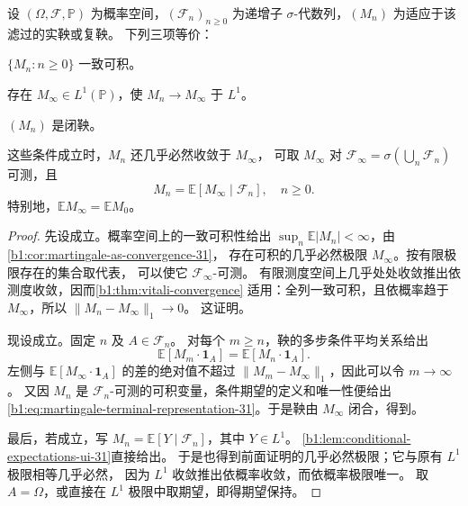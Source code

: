 \begin{theorem}[一致可积鞅与终值表示]
\label{b1:thm:closed-martingale-31}
设 \((\Omega,\mathcal F,\mathbb P)\) 为概率空间，\((\mathcal F_n)_{n\geq0}\)
为递增子 \(\sigma\)-代数列，\((M_n)\) 为适应于该滤过的实鞅或复鞅。
下列三项等价：
\begin{equivalences}
 \item\label{b1:item:closed-ui-31}\(\{M_n:n\geq0\}\) 一致可积。
 \item\label{b1:item:closed-l1-31}存在 \(M_\infty\in L^1(\mathbb P)\)，使 \(M_n\to M_\infty\) 于 \(L^1\)。
 \item\label{b1:item:closed-representation-31}\((M_n)\) 是闭鞅。
\end{equivalences}
这些条件成立时，\(M_n\) 还几乎必然收敛于 \(M_\infty\)，
可取 \(M_\infty\) 对 \(\mathcal F_\infty=\sigma(\bigcup_n\mathcal F_n)\) 可测，且
\begin{equation}
 M_n=\mathbb E[M_\infty\mid\mathcal F_n],\quad n\geq0.
 \label{b1:eq:martingale-terminal-representation-31}
\end{equation}
特别地，\(\mathbb E M_\infty=\mathbb E M_0\)。
\end{theorem}
\begin{proof}
先设成立。概率空间上的一致可积性给出
\(\sup_n\mathbb E|M_n|<\infty\)，由\cref{b1:cor:martingale-as-convergence-31}，
存在可积的几乎必然极限 \(M_\infty\)。按有限极限存在的集合取代表，
可以使它 \(\mathcal F_\infty\)-可测。
有限测度空间上几乎处处收敛推出依测度收敛，因而\cref{b1:thm:vitali-convergence}
适用：全列一致可积，且依概率趋于 \(M_\infty\)，所以 \(\|M_n-M_\infty\|_1\to0\)。
这证明。

现设成立。固定 \(n\) 及 \(A\in\mathcal F_n\)。
对每个 \(m\geq n\)，鞅的多步条件平均关系给出
\[
 \mathbb E[M_m\cdot\mathbf1_A]=\mathbb E[M_n\cdot\mathbf1_A].
\]
左侧与 \(\mathbb E[M_\infty\cdot\mathbf1_A]\) 的差的绝对值不超过
\(\|M_m-M_\infty\|_1\)，因此可以令 \(m\to\infty\)。
又因 \(M_n\) 是 \(\mathcal F_n\)-可测的可积变量，条件期望的定义和唯一性便给出
\eqref{b1:eq:martingale-terminal-representation-31}。于是鞅由 \(M_\infty\) 闭合，得到。

最后，若成立，写
\(M_n=\mathbb E[Y\mid\mathcal F_n]\)，其中 \(Y\in L^1\)。
\cref{b1:lem:conditional-expectations-ui-31}直接给出。
于是也得到前面证明的几乎必然极限；它与原有 \(L^1\) 极限相等几乎必然，
因为 \(L^1\) 收敛推出依概率收敛，而依概率极限唯一。
取 \(A=\Omega\)，或直接在 \(L^1\) 极限中取期望，即得期望保持。
\end{proof}

